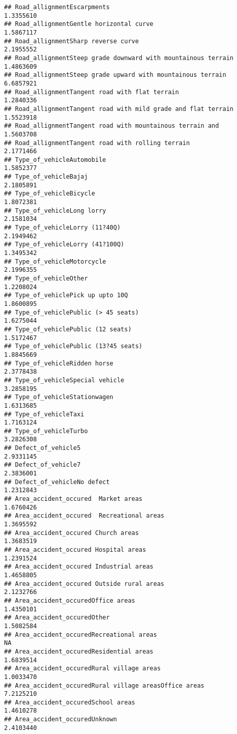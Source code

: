 \documentclass[
]{article}
\begin{document}
\begin{verbatim}
## Road_allignmentEscarpments                                    1.3355610
## Road_allignmentGentle horizontal curve                        1.5867117
## Road_allignmentSharp reverse curve                            2.1955552
## Road_allignmentSteep grade downward with mountainous terrain  1.4863609
## Road_allignmentSteep grade upward with mountainous terrain    6.6857921
## Road_allignmentTangent road with flat terrain                 1.2840336
## Road_allignmentTangent road with mild grade and flat terrain  1.5523918
## Road_allignmentTangent road with mountainous terrain and      1.5603708
## Road_allignmentTangent road with rolling terrain              2.1771466
## Type_of_vehicleAutomobile                                     1.5852377
## Type_of_vehicleBajaj                                          2.1805891
## Type_of_vehicleBicycle                                        1.8072381
## Type_of_vehicleLong lorry                                     2.1581034
## Type_of_vehicleLorry (11?40Q)                                 2.1949462
## Type_of_vehicleLorry (41?100Q)                                1.3495342
## Type_of_vehicleMotorcycle                                     2.1996355
## Type_of_vehicleOther                                          1.2208024
## Type_of_vehiclePick up upto 10Q                               1.8600895
## Type_of_vehiclePublic (> 45 seats)                            1.6275044
## Type_of_vehiclePublic (12 seats)                              1.5172467
## Type_of_vehiclePublic (13?45 seats)                           1.8845669
## Type_of_vehicleRidden horse                                   2.3778438
## Type_of_vehicleSpecial vehicle                                3.2858195
## Type_of_vehicleStationwagen                                   1.6313685
## Type_of_vehicleTaxi                                           1.7163124
## Type_of_vehicleTurbo                                          3.2826308
## Defect_of_vehicle5                                            2.9331145
## Defect_of_vehicle7                                            2.3836001
## Defect_of_vehicleNo defect                                    1.2312843
## Area_accident_occured  Market areas                           1.6760426
## Area_accident_occured  Recreational areas                     1.3695592
## Area_accident_occured Church areas                            1.3683519
## Area_accident_occured Hospital areas                          1.2391524
## Area_accident_occured Industrial areas                        1.4658805
## Area_accident_occured Outside rural areas                     2.1232766
## Area_accident_occuredOffice areas                             1.4350101
## Area_accident_occuredOther                                    1.5082584
## Area_accident_occuredRecreational areas                              NA
## Area_accident_occuredResidential areas                        1.6839514
## Area_accident_occuredRural village areas                      1.0033470
## Area_accident_occuredRural village areasOffice areas          7.2125210
## Area_accident_occuredSchool areas                             1.4610278
## Area_accident_occuredUnknown                                  2.4103440
\end{verbatim}
\end{document}
